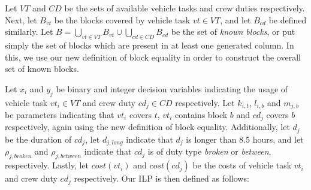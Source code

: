 \documentclass[]{article}
\begin{document}
Let $VT$ and $CD$ be the sets of available vehicle tasks and crew duties respectively. Next, let $B_{vt}$ be the blocks covered by vehicle task $vt \in VT$, and let $B_{cd}$ be defined similarly. Let $B = \bigcup_{vt \in VT} B_{vt} \cup \bigcup_{cd \in CD} B_{cd}$ be the set of \emph{known blocks}, or put simply the set of blocks which are present in at least one generated column. In this, we use our new definition of block equality in order to construct the overall set of known blocks. 

Let $x_i$ and $y_j$ be binary and integer decision variables indicating the usage of vehicle task $vt_i \in VT$ and crew duty $cd_j \in CD$ respectively. Let $k_{i,t}$, $l_{i,b}$ and $m_{j,b}$ be parameters indicating that $vt_i$ covers $t$, $vt_i$ contains block $b$ and $cd_j$ covers $b$ respectively, again using the new definition of block equality. Additionally, let $d_j$ be the duration of $cd_j$, let $d_{j,\textit{long}}$ indicate that $d_j$ is longer than 8.5 hours, and let $\rho_{j,\textit{broken}}$ and $\rho_{j,\textit{between}}$ indicate that $cd_j$ is of duty type \textit{broken} or \textit{between}, respectively. Lastly, let $cost(vt_i)$ and $cost(cd_j)$ be the costs of vehicle task $vt_i$ and crew duty $cd_j$ respectively. Our ILP is then defined as follows:
\end{document}
